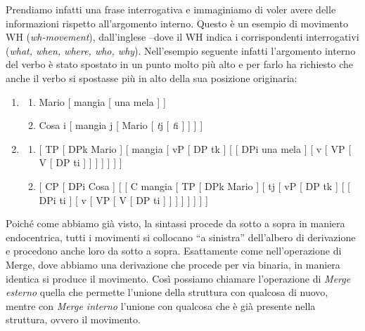 \documentclass[
  a4paper,
  twoside,
  11pt,
  chapterprefix=false,
  bibliography=totocnumbered,
  listof=flat]{scrbook}
\providecommand{\tightlist}{%
  \setlength{\itemsep}{0pt}\setlength{\parskip}{0pt}}
\begin{document}
Prendiamo infatti una frase interrogativa e immaginiamo di voler avere delle informazioni rispetto all'argomento interno. Questo è un esempio di movimento WH (\emph{wh-movement}), dall'inglese --dove il WH indica i corrispondenti interrogativi (\emph{what, when, where, who, why}). Nell'esempio seguente infatti l'argomento interno del verbo è stato spostato in un punto molto più alto e per farlo ha richiesto che anche il verbo si spostasse più in alto della sua posizione originaria:

\begin{enumerate}
\def\labelenumi{(\arabic{enumi})}
\setcounter{enumi}{14}
\item
  \begin{enumerate}
  \def\labelenumii{\alph{enumii}.}
  \tightlist
  \item
    Mario {[} mangia {[} una mela {]} {]}
  \item
    Cosa i {[} mangia j {[} Mario {[} \emph{t}j {[} \emph{t}i {]} {]} {]} {]}
  \end{enumerate}
\item
  \begin{enumerate}
  \def\labelenumii{\alph{enumii}.}
  \tightlist
  \item
    {[} TP {[} DPk Mario {]} {[} mangia {[} vP {[} DP tk {]} {[} {[} DPi una mela {]} {[} v {[} VP {[} V {[} DP ti {]} {]} {]} {]} {]} {]} {]}
  \item
    {[} CP {[} DPi Cosa {]} {[} {[} C mangia {[} TP {[} DPk Mario {]} {[} tj {[} vP {[} DP tk {]} {[} {[} DPi ti {]} {[} v {[} VP {[} V {[} DP ti {]} {]} {]} {]} {]} {]} {]} {]}
  \end{enumerate}
\end{enumerate}

Poiché come abbiamo già visto, la sintassi procede da sotto a sopra in maniera endocentrica, tutti i movimenti si collocano \enquote{a sinistra} dell'albero di derivazione e procedono anche loro da sotto a sopra.
Esattamente come nell'operazione di Merge, dove abbiamo una derivazione che procede per via binaria, in maniera identica si produce il movimento. Così possiamo chiamare l'operazione di \emph{Merge esterno} quella che permette l'unione della struttura con qualcosa di nuovo, mentre con \emph{Merge interno} l'unione con qualcosa che è già presente nella struttura, ovvero il movimento.
\end{document}
